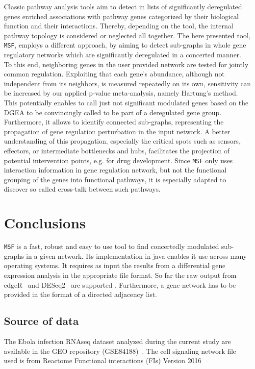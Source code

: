 \documentclass[10pt,a4paper,twocolumn]{article}
\begin{document}
Classic pathway analysis tools aim to detect in lists of significantly
deregulated genes enriched associations with pathway genes categorized
by their biological function and their interactions. Thereby,
depending on the tool, the internal pathway topology is considered or
neglected all together. The here presented tool, \texttt{MSF}, employs
a different approach, by aiming to detect sub-graphs in whole gene
regulatory networks which are significantly deregulated in a concerted
manner. To this end, neighboring genes in the user provided network
are tested for jointly common regulation. Exploiting that each gene's
abundance, although not independent from its neighbors, is measured
repeatedly on its own, sensitivity can be increased by our applied
p-value meta-analysis, namely Hartung's method. This potentially
enables to call just not significant modulated genes based on the DGEA
to be convincingly called to be part of a deregulated gene group.
Furthermore, it allows to identify connected sub-graphs, representing
the propagation of gene regulation perturbation in the input
network. A better understanding of this propagation, especially the
critical spots such as sensors, effectors, or intermediate bottlenecks
and hubs, facilitates the projection of potential intervention points,
e.g. for drug development. Since \texttt{MSF} only uses interaction
information in gene regulation network, but not the functional
grouping of the genes into functional pathways, it is especially
adapted to discover so called cross-talk between such pathways.


\section*{Conclusions}

\texttt{MSF} is a fast, robust and easy to use tool to find
concertedly modulated sub-graphs in a given network. Its
implementation in java enables it use across many operating
systems. It requires as input the results from a differential gene
expression analysis in the appropriate file format. So far the raw
output from edgeR~\cite{edgeR} and DESeq2~\cite{love2014moderated} are supported
. Furthermore, a gene network has to be provided in the format of a directed adjacency list.

\subsection*{Source of data}

The Ebola infection RNAseq dataset analyzed during the current study
are available in the GEO repository (GSE84188)~\cite{Olejnik}. The cell signaling network file used is from Reactome
Functional interactions (FIs) Version 2016~\cite{Cytokegg}
\end{document}
